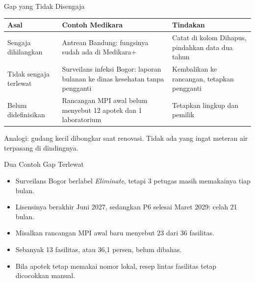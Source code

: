 \documentclass[aspectratio=169, table, 12pt]{beamer}
\begin{document}
\begin{frame}{{\Large Gap yang Tidak Disengaja}}
  \footnotesize
  \begin{tabularx}{\textwidth}{>{\raggedright\arraybackslash}p{3.1cm}>{\raggedright\arraybackslash}X>{\raggedright\arraybackslash}X}
    \hline
    \textbf{Asal} & \textbf{Contoh Medikara} & \textbf{Tindakan} \\ \hline
    Sengaja dihilangkan & Antrean Bandung: fungsinya sudah ada di Medikara+ & Catat di kolom Dihapus, pindahkan data dua tahun \\ \hline
    Tidak sengaja terlewat & Surveilans infeksi Bogor: laporan bulanan ke dinas kesehatan tanpa pengganti & Kembalikan ke rancangan, tetapkan pengganti \\ \hline
    Belum didefinisikan & Rancangan MPI awal belum menyebut 12 apotek dan 1 laboratorium & Tetapkan lingkup dan pemilik \\ \hline
  \end{tabularx}

  \vspace{8pt}
  \small Analogi: gudang kecil dibongkar saat renovasi. Tidak ada yang ingat meteran air terpasang di dindingnya.
\end{frame}

\begin{frame}{{\Large Dua Contoh Gap Terlewat}}
  \vspace{10pt}
  \begin{itemize}
    \item Surveilans Bogor berlabel \textit{Eliminate}, tetapi 3 petugas masih memakainya tiap bulan.
    \item Lisensinya berakhir Juni 2027, sedangkan P6 selesai Maret 2029: celah 21 bulan.
    \item Misalkan rancangan MPI awal baru menyebut 23 dari 36 fasilitas.
    \item Sebanyak 13 fasilitas, atau 36,1 persen, belum dibahas.
    \item Bila apotek tetap memakai nomor lokal, resep lintas fasilitas tetap dicocokkan manual.
  \end{itemize}
\end{frame}
\end{document}
